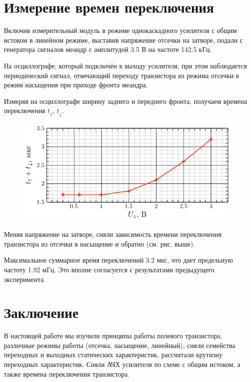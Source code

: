 \documentclass[a4paper,14pt]{extarticle}
\begin{document}
\section{Измерение времен переключения}
Включив измерительный модуль в режиме однокаскадного усилителя с общим истоком в линейном режиме, выставив напряжение отсечки на затворе, подали с генератора сигналов меандр с амплитудой 3.5 В на частоте 142.5 кГц.

На осциллографе, который подключён к выходу усилителя, при этом наблюдается периодический сигнал, отвечающий переходу транзистора из режима отсечки в режим насыщения при приходе фронта меандра.

Измеряя на осциллографе ширину заднего и переднего фронта, получаем времена переключения $t_\uparrow$, $t_\downarrow$. 

\begin{figure}[H]
	\centering
	\includegraphics[scale=1.5]{fig/t_from_uz.pdf}
	\vspace{-1em}
	\label{fig:tfuz}
\end{figure}
Меняя напряжение на затворе, сняли зависимость времени переключения транзистора из отсечки в насыщение и обратно (см. рис. выше).

Максимальное суммарное время переключений  3.2 мкс, что дает предельную частоту 1.92 мГц. Это вполне согласуется с результатами предыдущего эксперимента.



\vspace{-1em}
\section*{Заключение}
В настоящей работе мы изучили принципы работы полевого транзистора, различные режимы работы (отсечка, насыщение, линейный), сняли семейства переходных и выходных статических характеристик, рассчитали крутизну переходных характеристик. Сняли АЧХ усилителя по схеме  с общим истоком, а также времена переключения транзистора.
\end{document}
